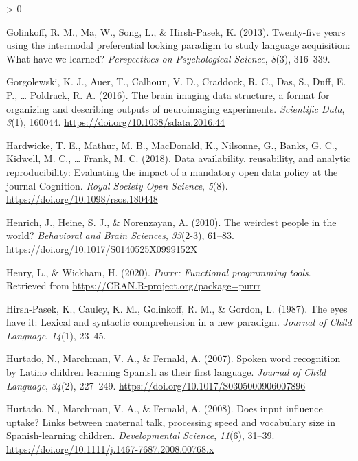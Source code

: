 \documentclass[
  english,
  man,floatsintext]{apa6}
\newlength{\cslhangindent}
\newenvironment{CSLReferences}[2] %
 {%
  \setlength{\parindent}{0pt}
  \ifodd #1 \everypar{\setlength{\hangindent}{\cslhangindent}}\ignorespaces\fi
  \ifnum #2 > 0
  \setlength{\parskip}{#2\baselineskip}
  \fi
 }%
 {}
\begin{document}
\begin{CSLReferences}{1}{0}
\leavevmode\hypertarget{ref-golinkoff2013}{}%
Golinkoff, R. M., Ma, W., Song, L., \& Hirsh-Pasek, K. (2013). {Twenty-five years using the intermodal preferential looking paradigm to study language acquisition: What have we learned?} \emph{Perspectives on Psychological Science}, \emph{8}(3), 316--339.

\leavevmode\hypertarget{ref-gorgolewski_brain_2016}{}%
Gorgolewski, K. J., Auer, T., Calhoun, V. D., Craddock, R. C., Das, S., Duff, E. P., \ldots{} Poldrack, R. A. (2016). The brain imaging data structure, a format for organizing and describing outputs of neuroimaging experiments. \emph{Scientific Data}, \emph{3}(1), 160044. \url{https://doi.org/10.1038/sdata.2016.44}

\leavevmode\hypertarget{ref-hardwicke2018}{}%
Hardwicke, T. E., Mathur, M. B., MacDonald, K., Nilsonne, G., Banks, G. C., Kidwell, M. C., \ldots{} Frank, M. C. (2018). {Data availability, reusability, and analytic reproducibility: Evaluating the impact of a mandatory open data policy at the journal Cognition}. \emph{Royal Society Open Science}, \emph{5}(8). \url{https://doi.org/10.1098/rsos.180448}

\leavevmode\hypertarget{ref-Henrich2010}{}%
Henrich, J., Heine, S. J., \& Norenzayan, A. (2010). {The weirdest people in the world?} \emph{Behavioral and Brain Sciences}, \emph{33}(2-3), 61--83. \url{https://doi.org/10.1017/S0140525X0999152X}

\leavevmode\hypertarget{ref-R-purrr}{}%
Henry, L., \& Wickham, H. (2020). \emph{Purrr: Functional programming tools}. Retrieved from \url{https://CRAN.R-project.org/package=purrr}

\leavevmode\hypertarget{ref-hirshpasek1987}{}%
Hirsh-Pasek, K., Cauley, K. M., Golinkoff, R. M., \& Gordon, L. (1987). {The eyes have it: Lexical and syntactic comprehension in a new paradigm}. \emph{Journal of Child Language}, \emph{14}(1), 23--45.

\leavevmode\hypertarget{ref-Hurtado2007}{}%
Hurtado, N., Marchman, V. A., \& Fernald, A. (2007). {Spoken word recognition by Latino children learning Spanish as their first language}. \emph{Journal of Child Language}, \emph{34}(2), 227--249. \url{https://doi.org/10.1017/S0305000906007896}

\leavevmode\hypertarget{ref-Hurtado2008}{}%
Hurtado, N., Marchman, V. A., \& Fernald, A. (2008). {Does input influence uptake? Links between maternal talk, processing speed and vocabulary size in Spanish-learning children}. \emph{Developmental Science}, \emph{11}(6), 31--39. \url{https://doi.org/10.1111/j.1467-7687.2008.00768.x}


\end{CSLReferences}
\end{document}
